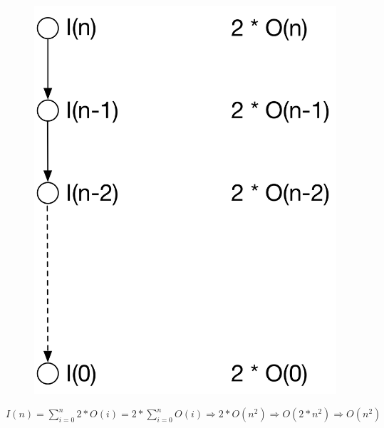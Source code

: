 \documentclass{article}
\begin{document}
\begin{figure}[H]
    \centering
    \includegraphics[scale=0.5]{1a)}
\end{figure}

$I(n) = \sum_{i=0}^{n} 2 * O(i) = 2 * \sum_{i=0}^{n} O(i) \Rightarrow  2 * O(n^2) \Rightarrow  O(2 * n^2) \Rightarrow O(n^2)$



\end{document}
